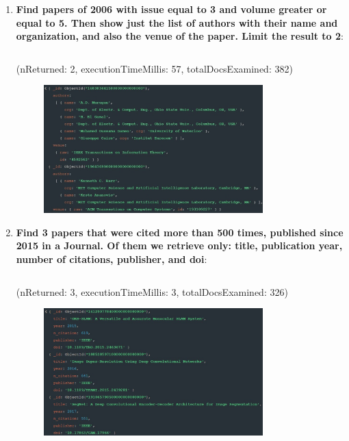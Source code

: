 \documentclass{Configuration_Files/PoliMi3i_thesis}
\begin{document}
\begin{enumerate}

    \item \textbf{Find papers of 2006 with issue equal to 3 and volume greater or equal to 5. Then show just the list of authors with their name and organization, and also the venue of the paper. Limit the result to 2}:
    \inputminted[linenos,tabsize=2,breaklines]{MQL}{code/queries_mongodb/query_1.txt}
    (nReturned: 2, executionTimeMillis: 57, totalDocsExamined: 382)
    \begin{figure}[H]
        \centering
        \includegraphics[width=0.8\textwidth]{Images/queries_mongodb/query_1.jpg}
    \end{figure}
    
    \item \textbf{Find 3 papers that were cited more than 500 times, published since 2015 in a Journal. Of them we retrieve only: title,
    publication year, number of citations, publisher, and doi}:
    \inputminted[linenos,tabsize=2,breaklines]{MQL}{code/queries_mongodb/query_2.txt}
    (nReturned: 3, executionTimeMillis: 3, totalDocsExamined: 326)
    \begin{figure}[H]
        \centering
        \includegraphics[width=0.8\textwidth]{Images/queries_mongodb/query_2.jpg}
    \end{figure}


\end{enumerate}
\end{document}
